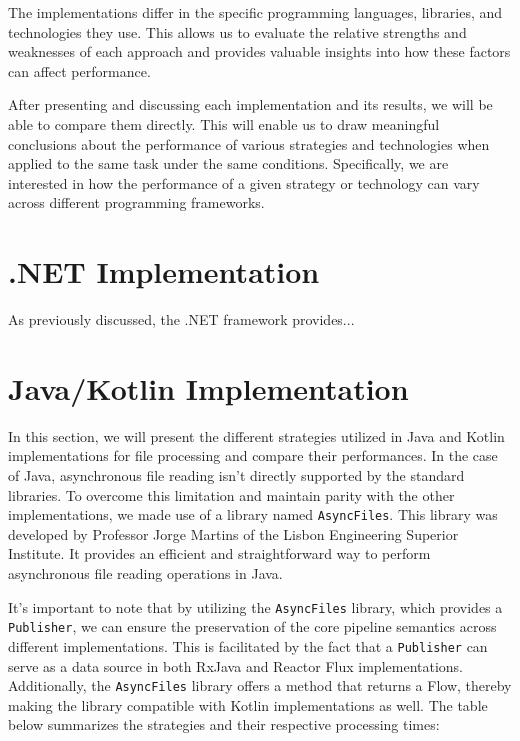 The implementations differ in the specific programming languages, libraries, and technologies they use. This allows us to evaluate the relative strengths and weaknesses of each approach and provides valuable insights into how these factors can affect performance.

After presenting and discussing each implementation and its results, we will be able to compare them directly. This will enable us to draw meaningful conclusions about the performance of various strategies and technologies when applied to the same task under the same conditions. Specifically, we are interested in how the performance of a given strategy or technology can vary across different programming frameworks.

\section{.NET Implementation}
\label{sec:dotnet_implementation}
As previously discussed, the .NET framework provides...

\section{Java/Kotlin Implementation}
\label{sec:java_implementation}

In this section, we will present the different strategies utilized in Java and Kotlin implementations for file processing and compare their performances.
In the case of Java, asynchronous file reading isn't directly supported by the standard libraries. To overcome this limitation and maintain parity with the other implementations, we made use of a library named \texttt{AsyncFiles}. This library was developed by Professor Jorge Martins of the Lisbon Engineering Superior Institute. It provides an efficient and straightforward way to perform asynchronous file reading operations in Java.

It's important to note that by utilizing the \texttt{AsyncFiles} library, which provides a \texttt{Publisher}, we can ensure the preservation of the core pipeline semantics across different implementations. This is facilitated by the fact that a \texttt{Publisher} can serve as a data source in both RxJava and Reactor Flux implementations. Additionally, the \texttt{AsyncFiles} library offers a method that returns a Flow, thereby making the library compatible with Kotlin implementations as well.
The table below summarizes the strategies and their respective processing times:

